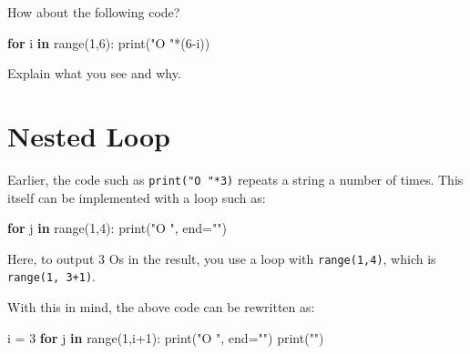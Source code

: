\documentclass[
  letterpaper,
]{scrbook}
\newenvironment{Shaded}{\begin{snugshade}}{\end{snugshade}}
\newcommand{\BuiltInTok}[1]{\textcolor[rgb]{0.00,0.23,0.31}{#1}}
\newcommand{\ControlFlowTok}[1]{\textcolor[rgb]{0.00,0.23,0.31}{\textbf{#1}}}
\newcommand{\DecValTok}[1]{\textcolor[rgb]{0.68,0.00,0.00}{#1}}
\newcommand{\KeywordTok}[1]{\textcolor[rgb]{0.00,0.23,0.31}{\textbf{#1}}}
\newcommand{\NormalTok}[1]{\textcolor[rgb]{0.00,0.23,0.31}{#1}}
\newcommand{\OperatorTok}[1]{\textcolor[rgb]{0.37,0.37,0.37}{#1}}
\newcommand{\StringTok}[1]{\textcolor[rgb]{0.13,0.47,0.30}{#1}}
\begin{document}
How about the following code?

\begin{Shaded}
\begin{Highlighting}[]
\ControlFlowTok{for}\NormalTok{ i }\KeywordTok{in} \BuiltInTok{range}\NormalTok{(}\DecValTok{1}\NormalTok{,}\DecValTok{6}\NormalTok{):}
    \BuiltInTok{print}\NormalTok{(}\StringTok{"O "}\OperatorTok{*}\NormalTok{(}\DecValTok{6}\OperatorTok{{-}}\NormalTok{i))}
\end{Highlighting}
\end{Shaded}

Explain what you see and why.

\section*{Nested Loop}\label{nested-loop}


Earlier, the code such as \texttt{print("O\ "*3)} repeats a string a
number of times. This itself can be implemented with a loop such as:

\begin{Shaded}
\begin{Highlighting}[]
\ControlFlowTok{for}\NormalTok{ j }\KeywordTok{in} \BuiltInTok{range}\NormalTok{(}\DecValTok{1}\NormalTok{,}\DecValTok{4}\NormalTok{):}
    \BuiltInTok{print}\NormalTok{(}\StringTok{"O "}\NormalTok{, end}\OperatorTok{=}\StringTok{""}\NormalTok{)}
\end{Highlighting}
\end{Shaded}

Here, to output 3 Os in the result, you use a loop with
\texttt{range(1,4)}, which is \texttt{range(1,\ 3+1)}.

With this in mind, the above code can be rewritten as:

\begin{Shaded}
\begin{Highlighting}[]
\NormalTok{i }\OperatorTok{=} \DecValTok{3}
\ControlFlowTok{for}\NormalTok{ j }\KeywordTok{in} \BuiltInTok{range}\NormalTok{(}\DecValTok{1}\NormalTok{,i}\OperatorTok{+}\DecValTok{1}\NormalTok{):}
    \BuiltInTok{print}\NormalTok{(}\StringTok{"O "}\NormalTok{, end}\OperatorTok{=}\StringTok{""}\NormalTok{)}
\BuiltInTok{print}\NormalTok{(}\StringTok{""}\NormalTok{)}
\end{Highlighting}
\end{Shaded}
\end{document}
